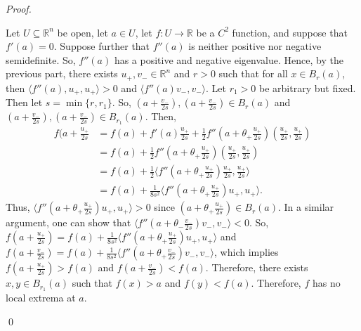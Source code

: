 \documentclass[12pt]{article}
\newenvironment{problem}[2][Problem]{\begin{trivlist}
\item[\hskip \labelsep {\bfseries #1}\hskip \labelsep {\bfseries #2.}]}{\end{trivlist}}
\newenvironment{sol}
    {\emph{Proof.}
    }
    {
    \qed
    }
\begin{document}
\begin{problem}{18}
\begin{itemize}
    \begin{sol}
    Let $U \subseteq \mathbb{R}^n$ be open, let $a \in U$, let $f : U \to \mathbb{R}$ be a $C^2$ function, and suppose that $f'(a) = 0$. Suppose further that $f''(a)$ is neither positive nor negative semidefinite. So, $f''(a)$ has a positive and negative eigenvalue. Hence, by the previous part, there exists $u_+,v_- \in \mathbb{R}^n$ and $r > 0$ such that for all $x \in B_r(a)$, then $\langle f''(a),u_+, u_+ \rangle > 0$ and $\langle f''(a)v_-, v_- \rangle$. Let $r_1 > 0$ be arbitrary but fixed. Then let $s = \min\{r,r_1\}$. So, $(a+\frac{v_-}{2s}),(a+\frac{v_-}{2s}) \in B_r(a)$ and $(a+\frac{v_-}{2s}),(a+\frac{v_-}{2s}) \in B_{r_1}(a)$. Then, \begin{align}
        f(a + \frac{u_+}{2s} &= f(a) + f'(a)\frac{u_+}{2s} + \frac{1}{2}f''(a + \theta_+ \frac{u_+}{2s})(\frac{u_+}{2s},\frac{u_+}{2s}) \tag*{($0 < \theta_+ < 1$)} \\ &= f(a) +  \frac{1}{2}f''(a + \theta_+ \frac{u_+}{2s})(\frac{u_+}{2s},\frac{u_+}{2s}) \tag*{(Since we know $f'(a) = 0$)} \\ &= f(a) + \frac{1}{2}\langle f''(a + \theta_+\frac{u_+}{2s})\frac{u_+}{2s},\frac{u_+}{2s}\rangle \\ &= f(a) + \frac{1}{8s^2}\langle f''(a + \theta_+\frac{u_+}{2s})u_+,u_+\rangle.
    \end{align}
    Thus, $\langle f''(a + \theta_+\frac{u_+}{2s})u_+,u_+\rangle > 0$ since $(a + \theta_+\frac{u_+}{2s}) \in B_r(a)$. In a similar argument, one can show that $\langle f''(a + \theta_-\frac{v_-}{2s})v_-,v_-\rangle < 0$. So, $f(a + \frac{u_+}{2s}) = f(a) + \frac{1}{8s^2}\langle f''(a + \theta_+\frac{u_+}{2s})u_+,u_+\rangle$ and $f(a + \frac{v_-}{2s}) = f(a) + \frac{1}{8s^2}\langle f''(a + \theta_+\frac{v_-}{2s})v_-,v_-\rangle$, which implies $f(a + \frac{u_+}{2s}) > f(a)$ and $f(a + \frac{v_-}{2s})  < f(a)$. Therefore, there exists $x,y \in B_{r_1}(a)$ such that $f(x) > a$ and $f(y) < f(a)$. Therefore, $f$ has no local extrema at $a$.
    \end{sol}
\end{itemize}
\end{problem}
\end{document}
